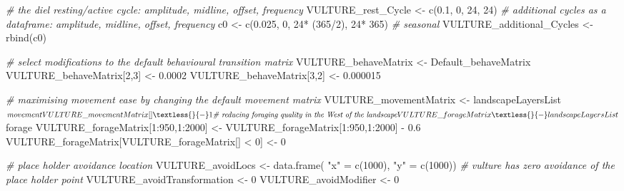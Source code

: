 \documentclass[10pt,a4paper]{article}
\newenvironment{Shaded}{}{}
\newcommand{\CommentTok}[1]{\textit{#1}}
\newcommand{\DecValTok}[1]{#1}
\newcommand{\FloatTok}[1]{#1}
\newcommand{\FunctionTok}[1]{#1}
\newcommand{\NormalTok}[1]{#1}
\newcommand{\OtherTok}[1]{#1}
\newcommand{\SpecialCharTok}[1]{#1}
\newcommand{\StringTok}[1]{#1}
\begin{document}
\begin{Shaded}
\begin{Highlighting}[]
\CommentTok{\# the diel resting/active cycle: amplitude, midline, offset, frequency}
\NormalTok{VULTURE\_rest\_Cycle }\OtherTok{\textless{}{-}} \FunctionTok{c}\NormalTok{(}\FloatTok{0.1}\NormalTok{, }\DecValTok{0}\NormalTok{, }\DecValTok{24}\NormalTok{, }\DecValTok{24}\NormalTok{)}
\CommentTok{\# additional cycles as a dataframe: amplitude, midline, offset, frequency}
\NormalTok{c0 }\OtherTok{\textless{}{-}} \FunctionTok{c}\NormalTok{(}\FloatTok{0.025}\NormalTok{, }\DecValTok{0}\NormalTok{, }\DecValTok{24}\SpecialCharTok{*}\NormalTok{ (}\DecValTok{365}\SpecialCharTok{/}\DecValTok{2}\NormalTok{), }\DecValTok{24}\SpecialCharTok{*} \DecValTok{365}\NormalTok{) }\CommentTok{\# seasonal}
\NormalTok{VULTURE\_additional\_Cycles }\OtherTok{\textless{}{-}} \FunctionTok{rbind}\NormalTok{(c0)}

\CommentTok{\# select modifications to the default behavioural transition matrix}
\NormalTok{VULTURE\_behaveMatrix }\OtherTok{\textless{}{-}}\NormalTok{ Default\_behaveMatrix}
\NormalTok{VULTURE\_behaveMatrix[}\DecValTok{2}\NormalTok{,}\DecValTok{3}\NormalTok{] }\OtherTok{\textless{}{-}} \FloatTok{0.0002}
\NormalTok{VULTURE\_behaveMatrix[}\DecValTok{3}\NormalTok{,}\DecValTok{2}\NormalTok{] }\OtherTok{\textless{}{-}} \FloatTok{0.000015}

\CommentTok{\# maximising movement ease by changing the default movement matrix}
\NormalTok{VULTURE\_movementMatrix }\OtherTok{\textless{}{-}}\NormalTok{ landscapeLayersList}\SpecialCharTok{$}\NormalTok{movement}
\NormalTok{VULTURE\_movementMatrix[] }\OtherTok{\textless{}{-}} \DecValTok{1}

\CommentTok{\# reducing foraging quality in the West of the landscape}
\NormalTok{VULTURE\_forageMatrix }\OtherTok{\textless{}{-}}\NormalTok{ landscapeLayersList}\SpecialCharTok{$}\NormalTok{forage}
\NormalTok{VULTURE\_forageMatrix[}\DecValTok{1}\SpecialCharTok{:}\DecValTok{950}\NormalTok{,}\DecValTok{1}\SpecialCharTok{:}\DecValTok{2000}\NormalTok{] }\OtherTok{\textless{}{-}}\NormalTok{ VULTURE\_forageMatrix[}\DecValTok{1}\SpecialCharTok{:}\DecValTok{950}\NormalTok{,}\DecValTok{1}\SpecialCharTok{:}\DecValTok{2000}\NormalTok{] }\SpecialCharTok{{-}} \FloatTok{0.6}
\NormalTok{VULTURE\_forageMatrix[VULTURE\_forageMatrix[] }\SpecialCharTok{\textless{}} \DecValTok{0}\NormalTok{] }\OtherTok{\textless{}{-}} \DecValTok{0}

\CommentTok{\# place holder avoidance location}
\NormalTok{VULTURE\_avoidLocs }\OtherTok{\textless{}{-}} \FunctionTok{data.frame}\NormalTok{(}
  \StringTok{"x"} \OtherTok{=} \FunctionTok{c}\NormalTok{(}\DecValTok{1000}\NormalTok{),}
  \StringTok{"y"} \OtherTok{=} \FunctionTok{c}\NormalTok{(}\DecValTok{1000}\NormalTok{))}
\CommentTok{\# vulture has zero avoidance of the place holder point}
\NormalTok{VULTURE\_avoidTransformation }\OtherTok{\textless{}{-}} \DecValTok{0}
\NormalTok{VULTURE\_avoidModifier }\OtherTok{\textless{}{-}} \DecValTok{0}
\end{Highlighting}
\end{Shaded}
\end{document}
